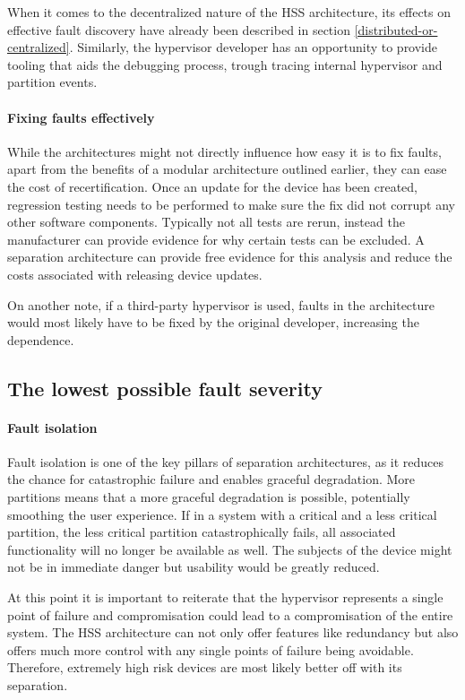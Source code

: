 When it comes to the decentralized nature of the \gls{HSS} architecture, its effects on effective fault discovery have already been described in section \ref{distributed-or-centralized}. Similarly, the hypervisor developer has an opportunity to provide tooling that aids the debugging process, trough tracing internal hypervisor and partition events.

\paragraph{Fixing faults effectively} \label{effective-fault-fixing}
While the architectures might not directly influence how easy it is to fix faults, apart from the benefits of a modular architecture outlined earlier, they can ease the cost of recertification. Once an update for the device has been created, regression testing needs to be performed to make sure the fix did not corrupt any other software components. Typically not all tests are rerun, instead the manufacturer can provide evidence for why certain tests can be excluded. A separation architecture can provide free evidence for this analysis and reduce the costs associated with releasing device updates.

On another note, if a third-party hypervisor is used, faults in the architecture would most likely have to be fixed by the original developer, increasing the dependence.

\subsection{The lowest possible fault severity}
\paragraph{Fault isolation}
Fault isolation is one of the key pillars of separation architectures, as it reduces the chance for catastrophic failure and enables graceful degradation. More partitions means that a more graceful degradation is possible, potentially smoothing the user experience. If in a system with a critical and a less critical partition, the less critical partition catastrophically fails, all associated functionality will no longer be available as well. The subjects of the device might not be in immediate danger but usability would be greatly reduced.

At this point it is important to reiterate that the hypervisor represents a single point of failure and compromisation could lead to a compromisation of the entire system. The \gls{HSS} architecture can not only offer features like redundancy but also offers much more control with any single points of failure being avoidable. Therefore, extremely high risk devices are most likely better off with its separation.

